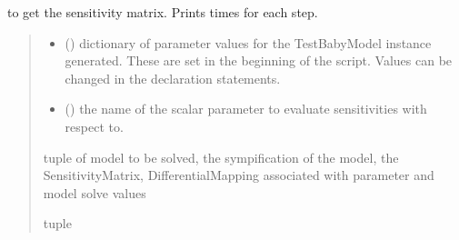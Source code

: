 \documentclass[letterpaper,10pt,english]{sphinxmanual}
\begin{document}
\begin{fulllineitems}
\label{\detokenize{src.sensitivity.speed_test:src.sensitivity.speed_test.run_timed}}
\pysigstartsignatures
\pysiglinewithargsret
{}
{\sphinxparamcomma {}}
{}
\pysigstopsignatures\begin{description}
\sphinxAtStartPar
to get the sensitivity matrix. Prints times for each step.

\end{description}
\begin{quote}\begin{description}
\begin{itemize}
\item {} 
\sphinxAtStartPar
{} () \textendash{} dictionary of parameter values for the TestBabyModel instance generated. These are set in the beginning of the script.
Values can be changed in the declaration statements.

\item {} 
\sphinxAtStartPar
{} () \textendash{} the name of the scalar parameter to evaluate sensitivities with respect to.

\end{itemize}

\sphinxAtStartPar
tuple of model to be solved, the sympification of the model, the SensitivityMatrix, DifferentialMapping associated with parameter and model solve values

\sphinxAtStartPar
tuple

\end{description}\end{quote}

\end{fulllineitems}

\end{document}
